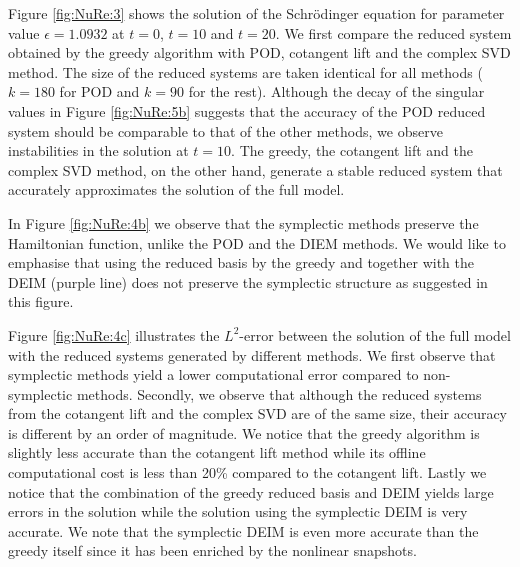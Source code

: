 Figure \ref{fig:NuRe:3} shows the solution of the Schr\"odinger equation for parameter value $\epsilon = 1.0932$ at $t=0$, $t=10$ and $t=20$. We first compare the reduced system obtained by the greedy algorithm with POD, cotangent lift and the complex SVD method. The size of the reduced systems are taken identical for all methods ($k=180$ for POD and $k=90$ for the rest). Although the decay of the singular values in Figure \ref{fig:NuRe:5b} suggests that the accuracy of the POD reduced system should be comparable to that of the other methods, we observe instabilities in the solution at $t=10$. The greedy, the cotangent lift and the complex SVD method, on the other hand, generate a stable reduced system that accurately approximates the solution of the full model.

{\edit In Figure \ref{fig:NuRe:4b} we observe that the symplectic methods preserve the Hamiltonian function, unlike the POD and the DIEM methods. We would like to emphasise that using the reduced basis by the greedy and together with the DEIM (purple line) does not preserve the symplectic structure as suggested in this figure.}

Figure \ref{fig:NuRe:4c} illustrates the $L^2$-error between the solution of the full model with the reduced systems generated by different methods. We first observe that symplectic methods yield a lower computational error compared to non-symplectic methods. Secondly, we observe that although the reduced systems from the cotangent lift and the complex SVD are of the same size, their accuracy is different by an order of magnitude. We notice that the greedy algorithm is slightly less accurate than the cotangent lift method while its offline computational cost is less than 20\% {\edit compared to the cotangent lift}. Lastly we notice that the combination of the greedy reduced basis and DEIM yields large errors in the solution while the solution using the symplectic DEIM is very accurate. We note that the symplectic DEIM is even more accurate than the greedy itself since it has been enriched by the nonlinear snapshots. 

